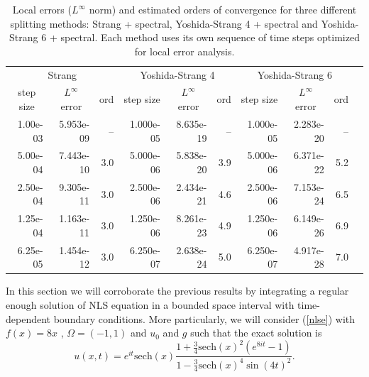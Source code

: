 \documentclass[a4paper,12pt]{article}
\begin{document}
\begin{table}[t]
\def\arraystretch{1.1}
\caption{Local errors ($L^{\infty}$ norm) and estimated orders of convergence for three different splitting methods: Strang + spectral, Yoshida-Strang 4 + spectral and Yoshida-Strang 6 + spectral. Each method uses its own sequence of time steps optimized for local error analysis.\label{tab:errores_locales_datosinf}}
\begin{center}
\vspace{-3mm}
\small
\begin{tabular}{rrrrrrrrrr}
\hline
\multicolumn{3}{c}{Strang} & \multicolumn{3}{c}{Yoshida-Strang 4} & \multicolumn{3}{c}{Yoshida-Strang 6} \\
\multicolumn{1}{c}{step size} & \multicolumn{1}{c}{$L^{\infty}$ error} & \multicolumn{1}{c}{ord} &
\multicolumn{1}{c}{step size} & \multicolumn{1}{c}{$L^{\infty}$ error} & \multicolumn{1}{c}{ord} &
\multicolumn{1}{c}{step size} & \multicolumn{1}{c}{$L^{\infty}$ error} & \multicolumn{1}{c}{ord} \\
\hline
1.00e-03 & 5.953e-09 & --       & 1.000e-05 & 8.635e-19 & --        & 1.000e-05 & 2.283e-20 & --         \\
5.00e-04 & 7.443e-10 & 3.0      & 5.000e-06 & 5.838e-20 & 3.9      & 5.000e-06 & 6.371e-22 & 5.2       \\
2.50e-04 & 9.305e-11 & 3.0      & 2.500e-06 & 2.434e-21 & 4.6     & 2.500e-06 & 7.153e-24 & 6.5       \\
1.25e-04 & 1.163e-11 & 3.0      & 1.250e-06 & 8.261e-23 & 4.9      & 1.250e-06 & 6.149e-26 & 6.9       \\
6.25e-05 & 1.454e-12 & 3.0      & 6.250e-07 & 2.638e-24 & 5.0      & 6.250e-07 & 4.917e-28 & 7.0       \\
\hline
\end{tabular}
\vspace{-3mm}
\end{center}
\end{table}

In this section we will corroborate the previous results by integrating a regular enough solution of NLS equation in a bounded space interval with time-dependent boundary conditions. More particularly, we will consider (\ref{nlse}) with $f(x)=8x$ , $\Omega=(-1,1)$ and $u_0$ and $g$ such that the exact solution is
$$
u(x,t)=e^{i t} \mbox{sech}(x) \frac{1+\frac{3}{4}\mbox{sech}(x)^2(e^{8it}-1)}{1-\frac{3}{4}\mbox{sech}(x)^4 \sin(4t)^2}.$$
\end{document}
